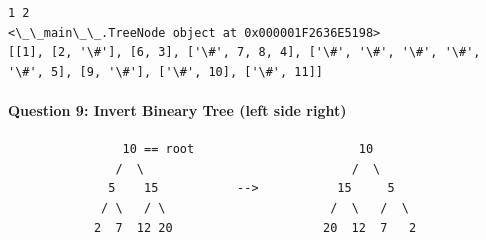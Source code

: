\documentclass[11pt]{article}
\begin{document}
    \begin{Verbatim}[commandchars=\\\{\}]
1 2
<\_\_main\_\_.TreeNode object at 0x000001F2636E5198>
[[1], [2, '\#'], [6, 3], ['\#', 7, 8, 4], ['\#', '\#', '\#', '\#', '\#', 5], [9, '\#'], ['\#', 10], ['\#', 11]]

    \end{Verbatim}

    \paragraph{Question 9: Invert Bineary Tree (left side
right)}\label{question-9-invert-bineary-tree-left-side-right}

\begin{verbatim}
                10 == root                       10
               /  \                             /  \
              5    15           -->           15     5
             / \   / \                       /  \   /  \ 
            2  7  12 20                     20  12  7   2
\end{verbatim}
\end{document}
